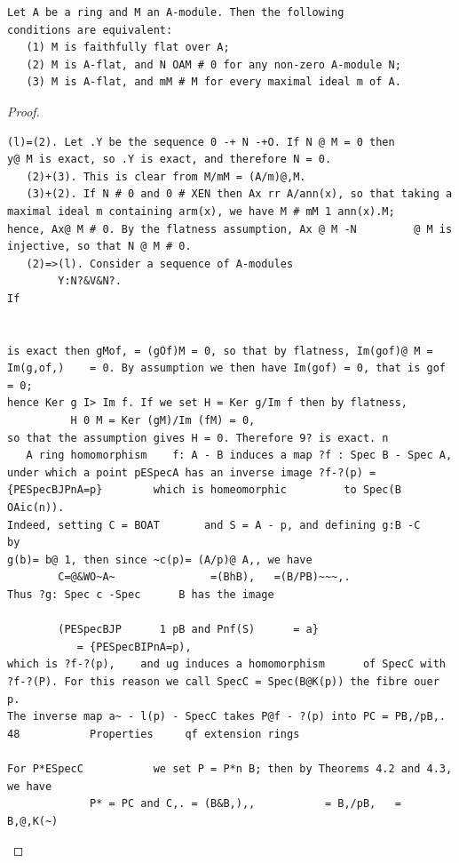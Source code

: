 \begin{theorem}\label{mcrt-auto-theorem-7-2}\uses{}
\begin{verbatim}
Let A be a ring and M an A-module. Then the following
conditions are equivalent:
   (1) M is faithfully flat over A;
   (2) M is A-flat, and N OAM # 0 for any non-zero A-module N;
   (3) M is A-flat, and mM # M for every maximal ideal m of A.
\end{verbatim}
\end{theorem}
\begin{proof}
\begin{verbatim}
(l)=(2). Let .Y be the sequence 0 -+ N -+O. If N @ M = 0 then
y@ M is exact, so .Y is exact, and therefore N = 0.
   (2)+(3). This is clear from M/mM = (A/m)@,M.
   (3)+(2). If N # 0 and 0 # XEN then Ax rr A/ann(x), so that taking a
maximal ideal m containing arm(x), we have M # mM 1 ann(x).M;
hence, Ax@ M # 0. By the flatness assumption, Ax @ M -N         @ M is
injective, so that N @ M # 0.
   (2)=>(l). Consider a sequence of A-modules
        Y:N?&V&N?.
If


is exact then gMof, = (gOf)M = 0, so that by flatness, Im(gof)@ M =
Im(g,of,)    = 0. By assumption we then have Im(gof) = 0, that is gof = 0;
hence Ker g I> Im f. If we set H = Ker g/Im f then by flatness,
          H 0 M = Ker (gM)/Im (fM) = 0,
so that the assumption gives H = 0. Therefore 9? is exact. n
   A ring homomorphism    f: A - B induces a map ?f : Spec B - Spec A,
under which a point pESpecA has an inverse image ?f-?(p) =
{PESpecBJPnA=p}        which is homeomorphic         to Spec(B OAic(n)).
Indeed, setting C = BOAT       and S = A - p, and defining g:B -C    by
g(b)= b@ 1, then since ~c(p)= (A/p)@ A,, we have
        C=@&WO~A~               =(BhB),   =(B/PB)~~~,.
Thus ?g: Spec c -Spec      B has the image

        (PESpecBJP      1 pB and Pnf(S)      = a}
           = {PESpecBIPnA=p),
which is ?f-?(p),    and ug induces a homomorphism      of SpecC with
?f-?(P). For this reason we call SpecC = Spec(B@K(p)) the fibre ouer p.
The inverse map a~ - l(p) - SpecC takes P@f - ?(p) into PC = PB,/pB,.
48           Properties     qf extension rings

For P*ESpecC           we set P = P*n B; then by Theorems 4.2 and 4.3, we have
             P* = PC and C,. = (B&B,),,           = B,/pB,   = B,@,K(~)
\end{verbatim}
\end{proof}


